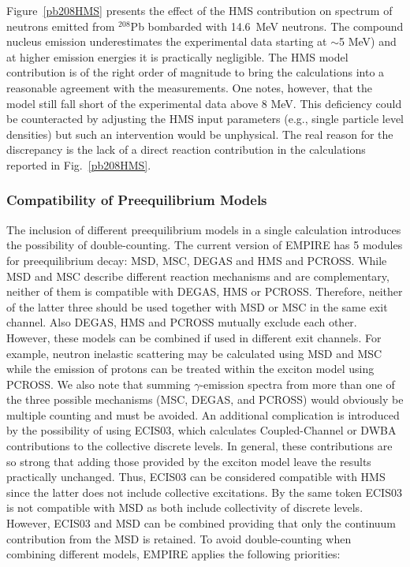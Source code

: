Figure~\ref{pb208HMS} presents the effect of the HMS contribution on spectrum of
neutrons emitted from $^{208}$Pb bombarded with 14.6~MeV neutrons. The
compound nucleus emission underestimates
the experimental data starting at $\sim$5 MeV)
and at higher emission energies it is practically negligible. The HMS model
contribution is of the right order of magnitude to bring the
calculations into a
reasonable agreement with the measurements. One notes, however, that the
model still fall short of the experimental data above 8 MeV. This
deficiency could be counteracted by adjusting the HMS input parameters (e.g.,
single particle level densities) but such an intervention would be unphysical.
The real reason for the discrepancy is the lack of a direct reaction
contribution in the calculations reported in Fig.~\ref{pb208HMS}.

\subsubsection{Compatibility of Preequilibrium Models}

The inclusion of different preequilibrium models in a single
calculation introduces the possibility of double-counting.
The current version of
EMPIRE has 5 modules for preequilibrium decay: MSD, MSC, DEGAS and HMS and
PCROSS. While MSD and MSC describe different reaction mechanisms and are
complementary, neither of them is compatible with DEGAS, HMS or PCROSS.
Therefore, neither of the latter three should be used together with MSD or MSC
in the same exit channel. Also DEGAS, HMS and PCROSS mutually exclude each
other. However, these models can be combined if used in different exit
channels. For example, neutron inelastic scattering may be calculated using
MSD and MSC while the emission of protons can be treated within the exciton
model using PCROSS. We also note that summing $\gamma$-emission spectra from
more than one of the three possible mechanisms (MSC, DEGAS, and PCROSS)
would obviously be multiple counting and must be avoided. An additional
complication is introduced by the possibility of using ECIS03, which
calculates Coupled-Channel or DWBA contributions to the collective discrete
levels. In general, these contributions are so strong that adding those
provided by the exciton model leave the results practically unchanged. Thus,
ECIS03 can be considered compatible with HMS since the latter does not
include collective excitations. By the same token ECIS03 is not compatible
with MSD as both include collectivity of discrete levels. However, ECIS03
and MSD can be combined providing that only the continuum contribution from
the MSD is retained. To avoid double-counting when combining different
models, EMPIRE applies the following priorities:


